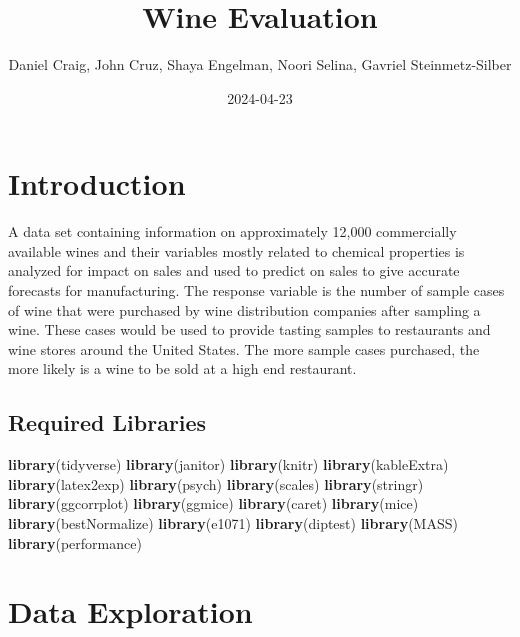 \documentclass[
]{article}
\title{Wine Evaluation}
\author{Daniel Craig, John Cruz, Shaya Engelman, Noori Selina, Gavriel
Steinmetz-Silber}
\date{2024-04-23}
\newenvironment{Shaded}{\begin{snugshade}}{\end{snugshade}}
\newcommand{\FunctionTok}[1]{\textcolor[rgb]{0.13,0.29,0.53}{\textbf{#1}}}
\newcommand{\NormalTok}[1]{#1}
\begin{document}
\maketitle

\section{Introduction}\label{introduction}

A data set containing information on approximately 12,000 commercially
available wines and their variables mostly related to chemical
properties is analyzed for impact on sales and used to predict on sales
to give accurate forecasts for manufacturing. The response variable is
the number of sample cases of wine that were purchased by wine
distribution companies after sampling a wine. These cases would be used
to provide tasting samples to restaurants and wine stores around the
United States. The more sample cases purchased, the more likely is a
wine to be sold at a high end restaurant.

\subsection{Required Libraries}\label{required-libraries}

\begin{Shaded}
\begin{Highlighting}[]
\FunctionTok{library}\NormalTok{(tidyverse)}
\FunctionTok{library}\NormalTok{(janitor)}
\FunctionTok{library}\NormalTok{(knitr)}
\FunctionTok{library}\NormalTok{(kableExtra)}
\FunctionTok{library}\NormalTok{(latex2exp)}
\FunctionTok{library}\NormalTok{(psych)}
\FunctionTok{library}\NormalTok{(scales)}
\FunctionTok{library}\NormalTok{(stringr)}
\FunctionTok{library}\NormalTok{(ggcorrplot)}
\FunctionTok{library}\NormalTok{(ggmice)}
\FunctionTok{library}\NormalTok{(caret)}
\FunctionTok{library}\NormalTok{(mice)}
\FunctionTok{library}\NormalTok{(bestNormalize)}
\FunctionTok{library}\NormalTok{(e1071)}
\FunctionTok{library}\NormalTok{(diptest)}
\FunctionTok{library}\NormalTok{(MASS)}
\FunctionTok{library}\NormalTok{(performance)}
\end{Highlighting}
\end{Shaded}

\section{Data Exploration}\label{data-exploration}
\end{document}
